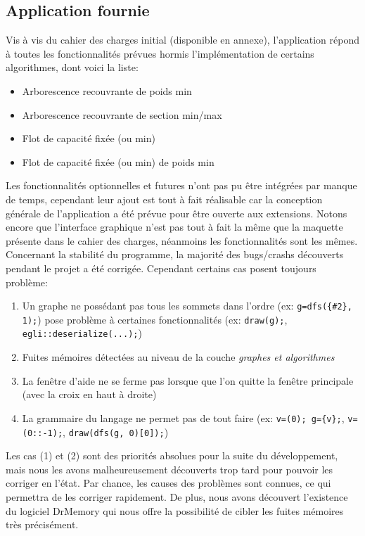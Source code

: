 \documentclass[french]{article}
\begin{document}
		\subsection{Application fournie}			
			Vis à vis du cahier des charges initial (disponible en annexe), l'application répond à toutes les fonctionnalités prévues hormis l'implémentation de certains algorithmes, dont voici la liste:
			\begin{itemize}
				\item Arborescence recouvrante de poids min
				\item Arborescence recouvrante de section min/max
				\item Flot de capacité fixée (ou min)
				\item Flot de capacité fixée (ou min) de poids min
			\end{itemize}
			Les fonctionnalités optionnelles et futures n'ont pas pu être intégrées par manque de temps, cependant leur ajout est tout à fait réalisable car la conception générale de l'application a été prévue pour être ouverte aux extensions. Notons encore que l'interface graphique n'est pas tout à fait la même que la maquette présente dans le cahier des charges, néanmoins les fonctionnalités sont les mêmes.\\
			
			Concernant la stabilité du programme, la majorité des bugs/crashs découverts pendant le projet a été corrigée. Cependant certains cas posent toujours problème:
			\begin{enumerate}
				\item Un graphe ne possédant pas tous les sommets dans l'ordre (ex: \texttt{g=dfs(\{\#2\}, 1);}) pose problème à certaines fonctionnalités (ex: \texttt{draw(g);}, \texttt{egli::deserialize(...);})
				\item Fuites mémoires détectées au niveau de la couche \textit{graphes et algorithmes}
				\item La fenêtre d'aide ne se ferme pas lorsque que l'on quitte la fenêtre principale (avec la croix en haut à droite)
				\item La grammaire du langage ne permet pas de tout faire (ex: \texttt{v=(0); g=\{v\};}, \texttt{v=(0::-1);}, \texttt{draw(dfs(g, 0)[0]);})
			\end{enumerate}
			Les cas (1) et (2) sont des priorités absolues pour la suite du développement, mais nous les avons malheureusement découverts trop tard pour pouvoir les corriger en l'état. Par chance, les causes des problèmes sont connues, ce qui permettra de les corriger rapidement. De plus, nous avons découvert l'existence du logiciel DrMemory \cite{drmemory} qui nous offre la possibilité de cibler les fuites mémoires très précisément.\\
			
\end{document}
